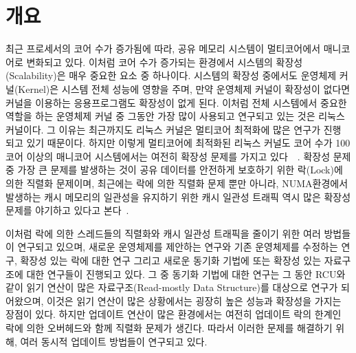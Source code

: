 \section{개요} \label{sec:intro}

최근 프로세서의 코어 수가 증가됨에 따라, 공유 메모리 시스템이 멀티코어에서 매니코어로 변화되고 있다.
이처럼 코어 수가 증가되는 환경에서 시스템의 확장성(Scalability)은 매우 중요한 요소 중 하나이다.
시스템의 확장성 중에서도 운영체제 커널(Kernel)은 시스템 전체 성능에 영향을 주며, 
만약 운영체제 커널이 확장성이 없다면 커널을 이용하는 응용프로그램도 확장성이 없게 된다.
이처럼 전체 시스템에서 중요한 역할을 하는 운영체제 커널 중 그동안 가장 많이 사용되고 연구되고 있는 것은 
리눅스 커널이다. 
그 이유는 최근까지도 리눅스 커널은 멀티코어 최적화에 많은 연구가 진행 되고 있기 때문이다. 
하지만 이렇게 멀티코어에 최적화된 리눅스 커널도 코어 수가 100코어 이상의 매니코어 
시스템에서는 여전히 확장성 문제를 가지고 있다~\cite{SilasBoydWickizer2010LinuxScales48}~\cite{Changwoo2016UMSF}.
확장성 문제 중 가장 큰 문제를 발생하는 것이 공유 데이터를 안전하게 보호하기 
위한 락(Lock)에 의한 직렬화 문제이며,
최근에는 락에 의한 직렬화 문제 뿐만 아니라, NUMA환경에서 발생하는 캐시 메모리의 일관성을 
유지하기 위한 캐시 일관성 트래픽 역시 많은 확장성 문제를
야기하고 있다고 본다\cite{mckenney2011parallel}~\cite{SilasBoydWickizerPth}.

이처럼 락에 의한 스레드들의 직렬화와 캐시 일관성 트래픽을 줄이기 위한 여러 방법들이 연구되고
있으며, 새로운 운영체제를 제안하는 연구와 
기존 운영체제를 수정하는 연구, 확장성 있는 락에 대한 연구 그리고 새로운 동기화 기법에 
또는 확장성 있는 자료구조에 대한 연구들이 진행되고 있다.
그 중 동기화 기법에 대한 연구는 그 동안 RCU와 같이 읽기 연산이 많은 자료구조(Read-mostly Data Structure)를 
대상으로 연구가 되어왔으며, 이것은 읽기 연산이 많은 상황에서는 굉장히 높은 성능과 확장성을 가지는 장점이 있다.
하지만 업데이트 연산이 많은 환경에서는 여전히 업데이트 락의 한계인 
락에 의한 오버헤드와 함께 직렬화 문제가 생긴다.  
따라서 이러한 문제를 해결하기 위해, 여러 동시적 업데이트 방법들이 연구되고 있다.

